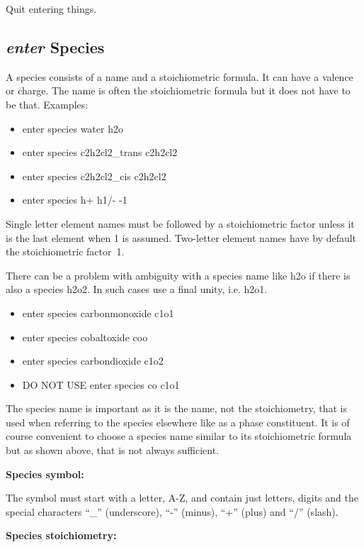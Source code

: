\documentclass[11pt]{article}
\begin{document}
Quit entering things.

\hypertarget{Enter species}{}
\subsection{{\em enter} Species}\label{sc:entersp}

A species consists of a name and a stoichiometric formula.  It can have
a valence or charge.  The name is often the stoichiometric formula
but it does not have to be that.  Examples:

\begin{itemize}
\item enter species water h2o
\item enter species c2h2cl2\_trans c2h2cl2
\item enter species c2h2cl2\_cis c2h2cl2
\item enter species h+ h1/- -1
\end{itemize}

Single letter element names must be followed by a stoichiometric
factor unless it is the last element when 1 is assumed.  Two-letter
element names have by default the stoichiometric factor~1.

There can be a problem with ambiguity with a species name like h2o if
there is also a species h2o2.  In such cases use a final unity, i.e.
h2o1.

\begin{itemize}
\item enter species carbonmonoxide c1o1
\item enter species cobaltoxide coo
\item enter species carbondioxide c1o2
\item DO NOT USE enter species co c1o1
\end{itemize}

The species name is important as it is the name, not the
stoichiometry, that is used when referring to the species elsewhere
like as a phase constituent.  It is of course convenient to choose a
species name similar to its stoichiometric formula but as shown above,
that is not always sufficient.

{\bf Species symbol:}

The symbol must start with a letter, A-Z, and contain just letters,
digits and the special characters ``\_'' (underscore), ``-'' (minus),
 ``+'' (plus) and ``/'' (slash).

{\bf Species stoichiometry:}
\end{document}
